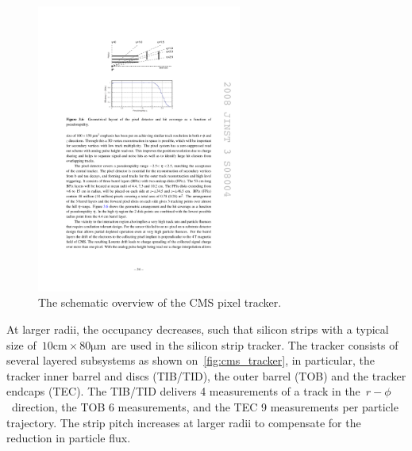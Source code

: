 \begin{figure}
\begin{centering}
\includegraphics[width=0.6\textwidth]{figures/exp/pixel.pdf}
\caption{The schematic overview of the CMS pixel tracker.}
\label{fig:cms_pixel}
\end{centering}
\end{figure}

At larger radii, the occupancy decreases, such that silicon strips with a typical size of~$10\mathrm{cm} \times 80\mathrm{\mu m}$~are used in the silicon strip tracker. The tracker consists of several layered subsystems as shown on~\cref{fig:cms_tracker}, in particular, the tracker inner barrel and discs (TIB/TID), the outer barrel (TOB) and the tracker endcaps (TEC). The TIB/TID delivers 4 measurements of a track in the~$r-\phi$~direction, the TOB 6 measurements, and the TEC 9 measurements per particle trajectory. The strip pitch increases at larger radii to compensate for the reduction in particle flux.

